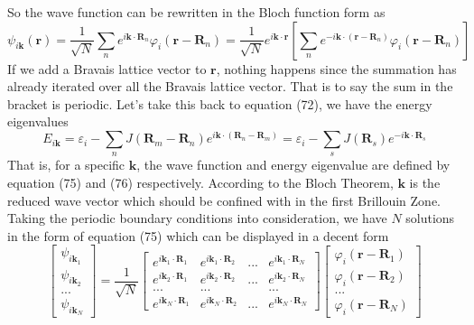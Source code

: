 \documentclass{article}
\begin{document}
So the wave function can be rewritten in the Bloch function form as\begin{equation}
    \psi_{i\mathbf{k}}(\mathbf{r})=\frac{1}{\sqrt{N}}\sum_n{e^{i\mathbf{k}\cdot\mathbf{R}_n}}\varphi_i(\mathbf{r}-\mathbf{R}_n)=\frac{1}{\sqrt{N}}e^{i\mathbf{k}\cdot\mathbf{r}}[\sum_n{e^{-i\mathbf{k}\cdot(\mathbf{r}-\mathbf{R}_n)}}\varphi_i(\mathbf{r}-\mathbf{R}_n)]
\end{equation}
If we add a Bravais lattice vector to $\mathbf{r}$, nothing happens since the summation has already iterated over all the Bravais lattice vector. That is to say the sum in the bracket is periodic. Let's take this back to equation (72), we have the energy eigenvalues \begin{equation}
    E_{i\mathbf{k}}=\varepsilon_i-\sum_n{J(\mathbf{R}_m-\mathbf{R}_n)}e^{i\mathbf{k}\cdot(\mathbf{R}_n-\mathbf{R}_m)}=\varepsilon_i-\sum_s{J(\mathbf{R}_s)}e^{-i\mathbf{k}\cdot\mathbf{R}_s}
\end{equation}
That is, for a specific $\mathbf{k}$, the wave function and energy eigenvalue are defined by equation (75) and (76) respectively. According to the Bloch Theorem, $\mathbf{k}$ is the reduced wave vector which should be confined with in the first Brillouin Zone. Taking the periodic boundary conditions into consideration, we have $N$ solutions in the form of equation (75) which can be displayed in a decent form\begin{equation}
    \begin{bmatrix}
    \psi_{i\mathbf{k}_1} \\
    \psi_{i\mathbf{k}_2} \\
    ... \\
    \psi_{i\mathbf{k}_N}
    \end{bmatrix}=\frac{1}{\sqrt{N}}\begin{bmatrix}
    e^{i\mathbf{k}_1\cdot\mathbf{R}_1} & e^{i\mathbf{k}_1\cdot\mathbf{R}_2} & ... & e^{i\mathbf{k}_1\cdot\mathbf{R}_N} \\
    e^{i\mathbf{k}_2\cdot\mathbf{R}_1} & e^{i\mathbf{k}_2\cdot\mathbf{R}_2} & ... & e^{i\mathbf{k}_2\cdot\mathbf{R}_N} \\
    ... & ... & & ... \\
    e^{i\mathbf{k}_N\cdot\mathbf{R}_1} & e^{i\mathbf{k}_N\cdot\mathbf{R}_2} & ... & e^{i\mathbf{k}_N\cdot\mathbf{R}_N}
    \end{bmatrix}\begin{bmatrix}
    \varphi_i(\mathbf{r}-\mathbf{R}_1) \\
    \varphi_i(\mathbf{r}-\mathbf{R}_2) \\
    ... \\
    \varphi_i(\mathbf{r}-\mathbf{R}_N)
    \end{bmatrix}
\end{equation}
\end{document}
